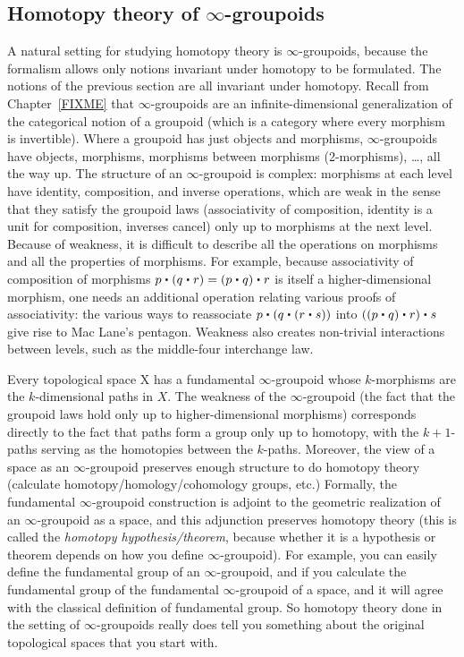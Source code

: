 \subsection{Homotopy theory of $\infty$-groupoids}

A natural setting for studying homotopy theory is $\infty$-groupoids, because
the formalism allows only notions invariant under homotopy to be formulated.
The notions of the previous section are all invariant under homotopy.
                                       Recall from Chapter~\ref{FIXME}
that $\infty$-groupoids are an infinite-dimensional generalization of
the categorical notion of a groupoid (which is a category where every
morphism is invertible).  Where a groupoid has just objects and
morphisms, $\infty$-groupoids have objects, morphisms, morphisms between
morphisms (2-morphisms), \dots, all the way up.  The structure of an $\infty$-groupoid is
complex: morphisms at each level have identity, composition,
and inverse operations, which are weak in the sense that they satisfy
the groupoid laws (associativity of composition, identity is a unit for
composition, inverses cancel) only up to morphisms at the next level.
Because of weakness, it is difficult to describe all the
operations on morphisms and all the properties of morphisms.  For example, because associativity
of composition of morphisms $p \ct (q \ct r) = (p \ct q) \ct r$ is
itself a higher-dimensional morphism, one needs an additional operation
relating various proofs of associativity: the various
ways to reassociate $p \ct (q \ct (r \ct s))$ into $((p \ct q) \ct r)
\ct s$ give rise to Mac Lane's pentagon.  Weakness also creates
non-trivial interactions between levels, such as the middle-four
interchange law.

Every topological space X has a fundamental $\infty$-groupoid whose
$k$-morphisms are the $k$-dimensional paths in $X$.  The weakness of the
$\infty$-groupoid (the fact that the groupoid laws hold only up to
higher-dimensional morphisms) corresponds directly to the fact that
paths form a group only up to homotopy, with the $k+1$-paths serving as the
homotopies between the $k$-paths.  Moreover, the view of a space as an
$\infty$-groupoid preserves enough structure to do homotopy theory
(calculate homotopy/homology/cohomology groups, etc.)  Formally, the
fundamental $\infty$-groupoid construction is adjoint to the geometric
realization of an $\infty$-groupoid as a space, and this adjunction
preserves homotopy theory (this is called the \emph{homotopy
  hypothesis/theorem}, because whether it is a hypothesis or theorem
depends on how you define $\infty$-groupoid).  For example, you can
easily define the fundamental group of an $\infty$-groupoid, and if you
calculate the fundamental group of the fundamental $\infty$-groupoid of
a space, and it will agree with the classical definition of fundamental
group.  So homotopy theory done in the setting of $\infty$-groupoids
really does tell you something about the original topological spaces
that you start with.  

